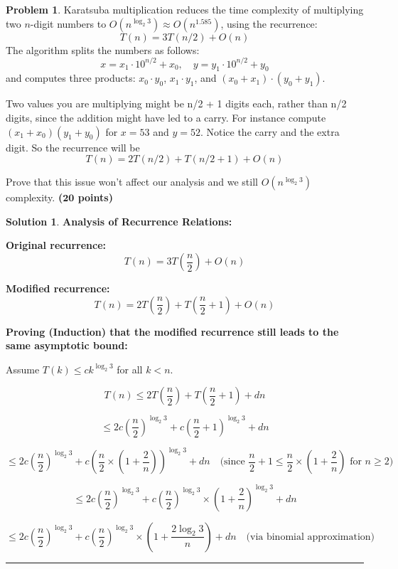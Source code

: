 \documentclass{article}
\theoremstyle{definition}
\newtheorem{problem}{Problem}
\def\fline{\rule{0.75\linewidth}{0.5pt}}
\newcommand{\finishline}{\begin{center}\fline\end{center}}
\newtheorem*{solution*}{Solution}
\newenvironment{solution}{\begin{solution*}}{{\finishline} \end{solution*}}
\newcommand{\grade}[1]{\hfill{\textbf{($\mathbf{#1}$ points)}}}
\begin{document}
\smallskip

\begin{problem}
    Karatsuba multiplication reduces the time complexity of multiplying two $n$-digit numbers to $O(n^{\log_2 3}) \approx O(n^{1.585})$, using the recurrence:
\[
T(n) = 3T(n/2) + O(n)
\]
The algorithm splits the numbers as follows:
\[
x = x_1 \cdot 10^{n/2} + x_0, \quad y = y_1 \cdot 10^{n/2} + y_0
\]
and computes three products: $x_0 \cdot y_0$, $x_1 \cdot y_1$, and $(x_0 + x_1) \cdot (y_0 + y_1)$.


Two values you are multiplying might be n/2 + 1 digits each, rather than n/2 digits, since the addition might have led to a carry. For instance compute $(x_1 + x_0)(y_1 + y_0)$ for $x = 53$ and $y = 52$. Notice the carry and the extra digit. So the recurrence will be \[
T(n) = 2T(n/2) + T(n/2+1) + O(n)
\]

Prove that this issue won't affect our analysis and we still $O(n^{\log_2 3})$ complexity. \grade{20}

\begin{solution}
	\textbf{Analysis of Recurrence Relations:}

	\textbf{Original recurrence:}
	\[
	T(n) = 3T\left(\frac{n}{2}\right) + O(n)
	\]
	
	\textbf{Modified recurrence:}
	\[
	T(n) = 2T\left(\frac{n}{2}\right) + T\left(\frac{n}{2} + 1\right) + O(n)
	\]
	
	\textbf{Proving (Induction) that the modified recurrence still leads to the same asymptotic bound:}
	
	Assume \( T(k) \leq c k^{\log_2 3} \) for all \( k < n \).
	
	\[
	T(n) \leq 2T\left(\frac{n}{2}\right) + T\left(\frac{n}{2} + 1\right) + dn
	\]
	
	\[
	\leq 2c\left(\frac{n}{2}\right)^{\log_2 3} + c\left(\frac{n}{2} + 1\right)^{\log_2 3} + dn
	\]
	
	\[
	\leq 2c\left(\frac{n}{2}\right)^{\log_2 3} + c\left(\frac{n}{2} \times \left(1 + \frac{2}{n}\right)\right)^{\log_2 3} + dn \quad \text{(since } \frac{n}{2} + 1 \leq \frac{n}{2} \times \left(1 + \frac{2}{n}\right) \text{ for } n \geq 2\text{)}
	\]
	
	\[
	\leq 2c\left(\frac{n}{2}\right)^{\log_2 3} + c\left(\frac{n}{2}\right)^{\log_2 3} \times \left(1 + \frac{2}{n}\right)^{\log_2 3} + dn
	\]
	
	\[
	\leq 2c\left(\frac{n}{2}\right)^{\log_2 3} + c\left(\frac{n}{2}\right)^{\log_2 3} \times \left(1 + \frac{2\log_2 3}{n}\right) + dn \quad \text{(via binomial approximation)}
	\]
	

\end{solution}
\end{problem}
\end{document}
